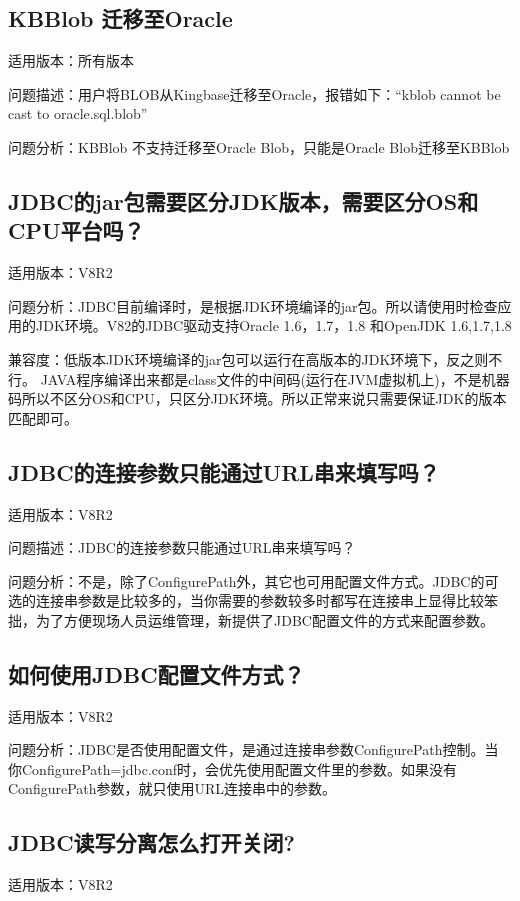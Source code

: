 \documentclass[letterpaper,10pt,english]{sphinxmanual}
\begin{document}
\subsection{KBBlob 迁移至Oracle}
\label{\detokenize{interface/jdbc:kbblob-oracle}}
适用版本：所有版本

问题描述：用户将BLOB从Kingbase迁移至Oracle，报错如下：“kblob cannot be cast to oracle.sql.blob”

问题分析：KBBlob 不支持迁移至Oracle Blob，只能是Oracle Blob迁移至KBBlob


\subsection{JDBC的jar包需要区分JDK版本，需要区分OS和CPU平台吗？}
\label{\detokenize{interface/jdbc:jdbcjarjdk-oscpu}}
适用版本：V8R2

问题分析：JDBC目前编译时，是根据JDK环境编译的jar包。所以请使用时检查应用的JDK环境。V82的JDBC驱动支持Oracle 1.6，1.7，1.8 和OpenJDK 1.6,1.7,1.8

兼容度：低版本JDK环境编译的jar包可以运行在高版本的JDK环境下，反之则不行。
JAVA程序编译出来都是class文件的中间码(运行在JVM虚拟机上)，不是机器码所以不区分OS和CPU，只区分JDK环境。所以正常来说只需要保证JDK的版本匹配即可。


\subsection{JDBC的连接参数只能通过URL串来填写吗？}
\label{\detokenize{interface/jdbc:jdbcurl}}
适用版本：V8R2

问题描述：JDBC的连接参数只能通过URL串来填写吗？

问题分析：不是，除了ConfigurePath外，其它也可用配置文件方式。JDBC的可选的连接串参数是比较多的，当你需要的参数较多时都写在连接串上显得比较笨拙，为了方便现场人员运维管理，新提供了JDBC配置文件的方式来配置参数。


\subsection{如何使用JDBC配置文件方式？}
\label{\detokenize{interface/jdbc:id2}}
适用版本：V8R2

问题分析：JDBC是否使用配置文件，是通过连接串参数ConfigurePath控制。当你ConfigurePath=jdbc.conf时，会优先使用配置文件里的参数。如果没有ConfigurePath参数，就只使用URL连接串中的参数。


\subsection{JDBC读写分离怎么打开关闭?}
\label{\detokenize{interface/jdbc:id3}}
适用版本：V8R2
\end{document}
